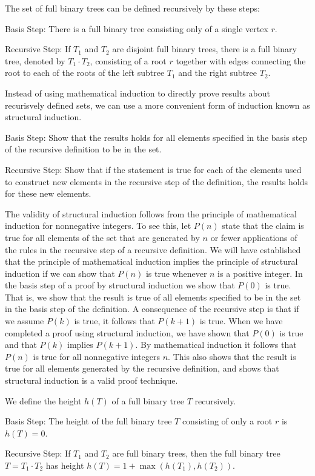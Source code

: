 \documentclass[../discrete.tex]{subfiles}
\begin{document}
\begin{definition}
    The set of full binary trees can be defined recursively by these steps:

    Basis Step: There is a full binary tree consisting only of a single vertex $r$.

    Recursive Step: If $T_1$ and $T_2$ are disjoint full binary trees, there is a full binary tree, 
    denoted by $T_1\cdot T_2$, consisting of a root $r$ together with edges connecting the root to 
    each of the roots of the left subtree $T_1$ and the right subtree $T_2$.
\end{definition}

Instead of using mathematical induction to directly prove results about recurisvely defined sets,
we can use a more convenient form of induction known as structural induction.

Basis Step: Show that the results holds for all elements specified in the basis step of the recursive definition to be in the set.

Recursive Step: Show that if the statement is true for each of the elements used to construct new elements 
in the recursive step of the definition, the results holds for these new elements.

The validity of structural induction follows from the principle of mathematical induction for 
nonnegative integers. To see this, let $P(n)$ state that the claim is true for 
all elements of the set that are generated by $n$ or fewer applications of the rules in the 
recursive step of a recursive definition. We will have established that the principle of mathematical induction 
implies the principle of structural induction if we can show that $P(n)$ is true whenever $n$ is a positive integer.
In the basis step of a proof by structural induction we show that $P(0)$ is true. That is, we show that the result is true 
of all elements specified to be in the set in the basis step of the definition. A consequence 
of the recursive step is that if we assume $P(k)$ is true, it follows that $P(k+1)$ is true.
When we have completed a proof using structural induction, we have shown that $P(0)$ is true and that $P(k)$ implies 
$P(k+1)$. By mathematical induction it follows that $P(n)$ is true for all nonnegative integers $n$. This also shows 
that the result is true for all elements generated by the recursive definition, and shows that structural induction is a valid proof technique.

\begin{definition}
    We define the height $h(T)$ of a full binary tree $T$ recursively.

    Basis Step: The height of the full binary tree $T$ consisting of only a root $r$ is $h(T) = 0$.

    Recursive Step: If $T_1$ and $T_2$ are full binary trees, then the full binary tree $T=T_1\cdot T_2$ has height 
    $h(T) = 1 + \max(h(T_1),h(T_2))$.
\end{definition}
\end{document}
